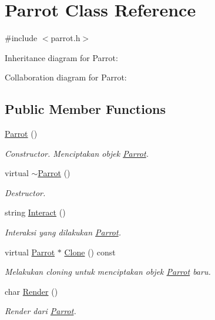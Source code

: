 \hypertarget{classParrot}{}\section{Parrot Class Reference}
\label{classParrot}


{\ttfamily \#include $<$parrot.\+h$>$}



Inheritance diagram for Parrot\+:


Collaboration diagram for Parrot\+:
\subsection*{Public Member Functions}
\begin{DoxyCompactItemize}
\item 
\hyperlink{classParrot_adfd08f638064b09dc46924ded14d1b32}{Parrot} ()
\begin{DoxyCompactList}\small\item\em Constructor. Menciptakan objek \hyperlink{classParrot}{Parrot}. \end{DoxyCompactList}\item 
virtual \hyperlink{classParrot_a02300897ced64c5a28347d385f4f0f00}{$\sim$\+Parrot} ()
\begin{DoxyCompactList}\small\item\em Destructor. \end{DoxyCompactList}\item 
string \hyperlink{classParrot_a3fdf1aa0851d53d31b5d225d755e4995}{Interact} ()
\begin{DoxyCompactList}\small\item\em Interaksi yang dilakukan \hyperlink{classParrot}{Parrot}. \end{DoxyCompactList}\item 
virtual \hyperlink{classParrot}{Parrot} $\ast$ \hyperlink{classParrot_aec7fd1385827d67522e1baf3242078b0}{Clone} () const 
\begin{DoxyCompactList}\small\item\em Melakukan cloning untuk menciptakan objek \hyperlink{classParrot}{Parrot} baru. \end{DoxyCompactList}\item 
char \hyperlink{classParrot_a27c491ab4ae56491fbe8d74e494bc46d}{Render} ()
\begin{DoxyCompactList}\small\item\em Render dari \hyperlink{classParrot}{Parrot}. \end{DoxyCompactList}\end{DoxyCompactItemize}
